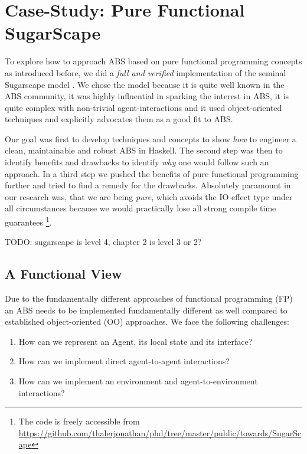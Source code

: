 \section{Case-Study: Pure Functional SugarScape}
\label{sec:case_study}

To explore how to approach ABS based on pure functional programming concepts as introduced before, we did a \textit{full and verified} implementation of the seminal Sugarscape model \cite{epstein_growing_1996}. We chose the model because it is quite well known in the ABS community, it was highly influential in sparking the interest in ABS, it is quite complex with non-trivial agent-interactions and it used object-oriented techniques and explicitly advocates them as a good fit to ABS. 

Our goal was first to develop techniques and concepts to show \textit{how} to engineer a clean, maintainable and robust ABS in Haskell. The second step was then to identify benefits and drawbacks to identify \textit{why} one would follow such an approach. In a third step we pushed the benefits of pure functional programming further and tried to find a remedy for the drawbacks. Absolutely paramount in our research was, that we are being \textit{pure}, which avoids the IO effect type under all circumstances because we would practically lose all strong compile time guarantees \footnote{The code is freely accessible from \url{https://github.com/thalerjonathan/phd/tree/master/public/towards/SugarScape}}.

TODO: \cite{macal_everything_2016} sugarscape is level 4, chapter 2 is level 3 or 2?


\subsection{A Functional View}
Due to the fundamentally different approaches of functional programming (FP) an ABS needs to be implemented fundamentally different as well compared to established object-oriented (OO) approaches. We face the following challenges:

\begin{enumerate}
	\item How can we represent an Agent, its local state and its interface?
	\item How can we implement direct agent-to-agent interactions?
	\item How can we implement an environment and agent-to-environment interactions? 
\end{enumerate}


